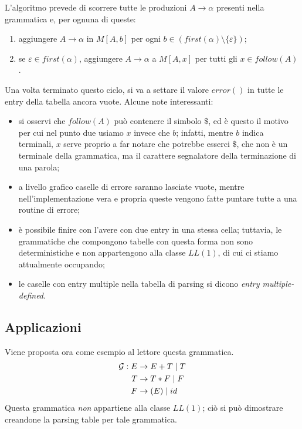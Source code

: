 \documentclass[class=book, crop=false, oneside, 12pt]{standalone}
\begin{document}
L'algoritmo prevede di scorrere tutte le produzioni \(A \to \alpha\) presenti nella grammatica e, per ognuna di queste:
\begin{enumerate}
    \item aggiungere \(A \to \alpha\) in \(M[A, b]\) per ogni \(b \in (first(\alpha)\setminus \{\varepsilon\})\);
    \item se  \(\varepsilon \in first(\alpha)\), aggiungere \(A \to \alpha\) a \(M[A, x]\) per tutti gli \(x \in follow(A)\). 
\end{enumerate}
Una volta terminato questo ciclo, si va a settare il valore \(error()\) in tutte le entry della tabella ancora vuote. Alcune note interessanti:
\begin{itemize}
    \item si osservi che \(follow(A)\) può contenere il simbolo \(\$\), ed è questo il motivo per cui nel punto due usiamo \(x\) invece che \(b\); infatti, mentre \(b\) indica terminali, \(x\) serve proprio a far notare che potrebbe esserci \(\$\), che non è un terminale della grammatica, ma il carattere segnalatore della terminazione di una parola;
    \item a livello grafico caselle di errore saranno lasciate vuote, mentre nell'implementazione vera e propria queste vengono fatte puntare tutte a una routine di errore;
    \item è possibile finire con l'avere con due entry in una stessa cella; tuttavia, le grammatiche che compongono tabelle con questa forma non sono deterministiche e non appartengono alla classe \(LL(1)\), di cui ci stiamo attualmente occupando;
    \item le caselle con entry multiple nella tabella di parsing si dicono \emph{entry multiple-defined}.
\end{itemize}

\subsection{Applicazioni}
Viene proposta ora come esempio al lettore questa grammatica.
\begin{align}
    \label{non-ll1_grammar}
    \mathcal{G}: E &\to E+T \mid T \\
    T &\to T*F \mid F \nonumber \\ \notag
    F &\to (E) \mid id \nonumber  \notag
\end{align}
Questa grammatica \emph{non} appartiene alla classe \(LL(1)\); ciò si può dimostrare creandone la parsing table per tale grammatica.
\end{document}
